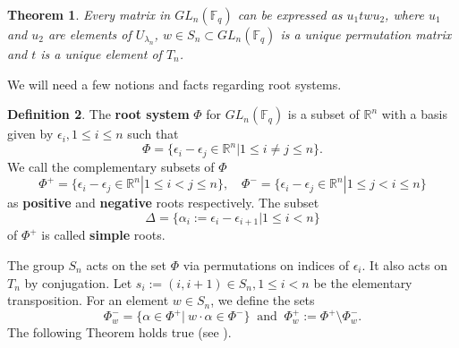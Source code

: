\documentclass[12pt,reqno]{amsart}
\newtheorem{thm}{Theorem}[section]
\theoremstyle{definition}
\newtheorem{defn}[thm]{Definition}
\theoremstyle{remark}
\newtheorem{rem}[thm]{Remark}
\numberwithin{equation}{section}
\newcommand{\GL}[1]{GL_{#1}(\mathbb{F}_q)}
\begin{document}
\begin{thm}
    Every matrix in $GL_n (\mathbb{F}_q)$ can be expressed as $u_1twu_2$, where $u_1$ and $u_2$ are elements of $U_{\lambda_n}$, $w\in S_n \subset \GL{n}$ is a unique permutation matrix and $t$ is a unique element of $T_n$.
\end{thm}
We will need a few notions and facts regarding root systems.
\begin{defn}
    The \textbf{root system} $\Phi$ for $\GL{n}$ is a subset of $\mathbb{R}^n$ with a basis given by $\epsilon_i,1\le i\le n$ such that
    \[
    \Phi=\{\epsilon_i-\epsilon_j\in\mathbb{R}^n|1\le i\neq j \le n\}.
    \]
    We call the complementary subsets of $\Phi$
    \[
    \Phi^+=\{\epsilon_i-\epsilon_j\in\mathbb{R}^n|1\le i< j \le n\},\quad \Phi^-=\{\epsilon_i-\epsilon_j\in\mathbb{R}^n|1\le j< i \le n\}
    \]
    as \textbf{positive} and \textbf{negative} roots respectively. The subset
    \[
    \Delta=\{\alpha_i:=\epsilon_i-\epsilon_{i+1}|1\le i<n\}
    \]
    of $\Phi^+$ is called \textbf{simple} roots.
\end{defn}



The group $S_n$ acts on the set $\Phi$ via permutations on indices of $\epsilon_i$. It also acts on $T_n$ by conjugation. Let $s_i:=(i,i+1)\in S_n, 1\le i<n$ be the elementary transposition. For an element $w \in S_n$, we define the sets
    \[
    \Phi^-_w = \{\alpha \in \Phi^+ |\ w\cdot \alpha \in \Phi^-\}\ \text{ and }\ \Phi^+_w:=\Phi^+ \setminus \Phi^-_w.
    \]
    The following Theorem holds true (see \cite{DB,H}). %
\end{document}
